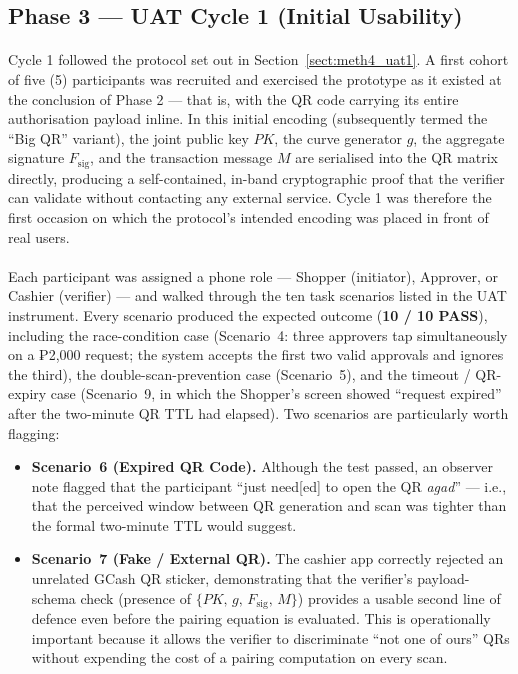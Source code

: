 \subsection{Phase 3 --- UAT Cycle 1 (Initial Usability)}
\label{sect:results_uat1}

\paragraph{}Cycle 1 followed the protocol set out in Section~\ref{sect:meth4_uat1}. A first cohort of five (5) participants was recruited and exercised the prototype as it existed at the conclusion of Phase 2 --- that is, with the QR code carrying its entire authorisation payload inline. In this initial encoding (subsequently termed the ``Big QR'' variant), the joint public key $PK$, the curve generator $g$, the aggregate signature $F_{\text{sig}}$, and the transaction message $M$ are serialised into the QR matrix directly, producing a self-contained, in-band cryptographic proof that the verifier can validate without contacting any external service. Cycle 1 was therefore the first occasion on which the protocol's intended encoding was placed in front of real users.

\paragraph{}Each participant was assigned a phone role --- Shopper (initiator), Approver, or Cashier (verifier) --- and walked through the ten task scenarios listed in the UAT instrument. Every scenario produced the expected outcome (\textbf{10 / 10 PASS}), including the race-condition case (Scenario~4: three approvers tap simultaneously on a ₱2{,}000 request; the system accepts the first two valid approvals and ignores the third), the double-scan-prevention case (Scenario~5), and the timeout / QR-expiry case (Scenario~9, in which the Shopper's screen showed ``request expired'' after the two-minute QR TTL had elapsed). Two scenarios are particularly worth flagging:

\begin{itemize}
  \item \textbf{Scenario~6 (Expired QR Code).} Although the test passed, an observer note flagged that the participant ``just need[ed] to open the QR \textit{agad}'' --- i.e., that the perceived window between QR generation and scan was tighter than the formal two-minute TTL would suggest.
  \item \textbf{Scenario~7 (Fake / External QR).} The cashier app correctly rejected an unrelated GCash QR sticker, demonstrating that the verifier's payload-schema check (presence of $\{PK,\, g,\, F_{\text{sig}},\, M\}$) provides a usable second line of defence even before the pairing equation is evaluated. This is operationally important because it allows the verifier to discriminate ``not one of ours'' QRs without expending the cost of a pairing computation on every scan.
\end{itemize}

